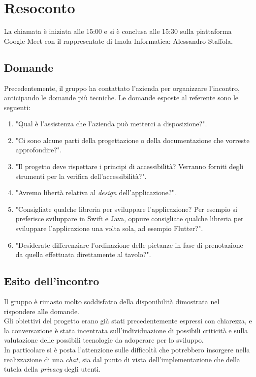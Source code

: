 \section{Resoconto}
La chiamata è iniziata alle 15:00 e si è conclusa alle 15:30 sulla piattaforma Google Meet con il rappresentate di Imola Informatica: Alessandro Staffola. \\

\subsection{Domande}
Precedentemente, il gruppo ha contattato l'azienda per organizzare l'incontro, anticipando le domande più tecniche.
Le domande esposte al referente sono le seguenti:
\begin{enumerate}
	\item "Qual è l'assistenza che l'azienda può metterci a disposizione?".
	\item "Ci sono alcune parti della progettazione o della documentazione che vorreste approfondire?".
	\item "Il progetto deve rispettare i principi di accessibilità? Verranno forniti degli strumenti per la verifica dell'accessibilità?".
	\item "Avremo libertà relativa al \textit{design} dell'applicazione?".
	\item "Consigliate qualche libreria per sviluppare l'applicazione? Per esempio si preferisce sviluppare in Swift e Java, oppure consigliate qualche libreria per sviluppare l'applicazione una volta sola, ad esempio Flutter?".
	\item "Desiderate differenziare l'ordinazione delle pietanze in fase di prenotazione da quella effettuata direttamente al tavolo?".
\end{enumerate}

\subsection{Esito dell'incontro}
Il gruppo è rimasto molto soddisfatto della disponibilità dimostrata nel rispondere alle domande. \\
Gli obiettivi del progetto erano già stati precedentemente espressi con chiarezza, e la conversazione è stata incentrata sull'individuazione di possibili criticità e sulla valutazione delle possibili tecnologie da adoperare per lo sviluppo. \\
In particolare si è posta l'attenzione sulle difficoltà che potrebbero insorgere nella realizzazione di una \textit{chat}, sia dal punto di vista dell'implementazione che della tutela della \textit{privacy} degli utenti.

